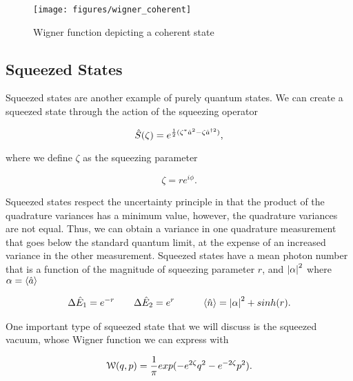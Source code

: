 \begin{figure}[!ht] 
 \centering 
 \texttt{[image: figures/wigner\_coherent]} 
 \caption[Wigner function for Coherent state]{Wigner function depicting a coherent state} 
 \label{fig:wigner_coh} 
\end{figure}

\subsection{Squeezed States}

Squeezed states are another example of purely quantum states.  We can create a squeezed state through the action of the squeezing operator \cite{garrison2008quantum}

\begin{equation}
  \label{eq:squeezing_operator}
  \hat{S}(\zeta) = e^{\frac{1}{2} (\zeta^* \hat{a}^{2} - \zeta \hat{a}^{\dagger 2}) },
\end{equation}

\noindent
where we define $\zeta$ as the squeezing parameter

\begin{equation}
  \label{eq:squeezing_parameter}
  \zeta = r e^{i \phi }.
\end{equation}

\noindent
Squeezed states respect the uncertainty principle in that the product of the quadrature variances has a minimum value, however, the quadrature variances are not equal.   Thus, we can obtain a variance in one quadrature measurement that goes below the standard quantum limit, at the expense of an increased variance in the other measurement.  Squeezed states have a mean photon number that is a function of the magnitude of squeezing parameter $r$, and $\left| \alpha \right|^2$ where $\alpha = \left< \hat{a} \right>$ \cite{gerry2005introductory}


\begin{eqnarray}
  \label{eq:squeezed_properties}
    \Delta \hat{E}_1 = e^{-r} \quad & \quad \Delta \hat{E}_2 = e^{r}   \quad & \quad  \left< \hat{n} \right> = \left| \alpha \right|^2 + sinh(r).
\end{eqnarray}

\noindent
One important type of squeezed state that we will discuss is the squeezed vacuum, whose Wigner function we can express with \cite{leonhardt1997measuring}

\begin{equation}
  \label{eq:wigner_squeezed_vacuum}
  \mathcal{W}(q,p) = \frac{1}{\pi} exp(-e^{2\zeta}q^2-e^{-2\zeta}p^2).
\end{equation}


